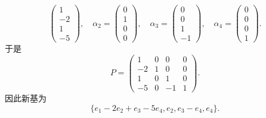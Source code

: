 \documentclass[../../main.tex]{subfiles}
\begin{document}
\begin{solution}
\[\begin{pmatrix}
1 \\
-2 \\
1 \\
-5
\end{pmatrix}, \quad \alpha_2 = \begin{pmatrix}
0 \\
1 \\
0 \\
0
\end{pmatrix}, \quad \alpha_3 = \begin{pmatrix}
0 \\
0 \\
1 \\
-1
\end{pmatrix}, \quad \alpha_4 = \begin{pmatrix}
0 \\
0 \\
0 \\
1
\end{pmatrix}.
\]
于是
\[
P = \begin{pmatrix}
1 & 0 & 0 & 0 \\
-2 & 1 & 0 & 0 \\
1 & 0 & 1 & 0 \\
-5 & 0 & -1 & 1
\end{pmatrix}.
\]
因此新基为
\[
\{e_1 - 2e_2 + e_3 - 5e_4, e_2, e_3 - e_4, e_4\}.
\] 

\end{solution}
\end{document}
